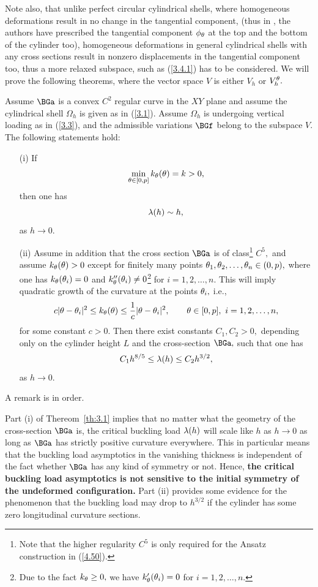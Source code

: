 Note also, that unlike perfect circular cylindrical shells, where homogeneous deformations result in no change in the tangential component, (thus in \cite{bib:Gra.Har.2}, the authors have prescribed the tangential component $\phi_\theta$ at the top and the bottom of the cylinder too), homogeneous deformations in general cylindrical shells with any cross sections result in nonzero displacements in the tangential component too, thus a more relaxed subspace, such as (\ref{3.4.1}) has to be considered. We will prove the following theorems, where the vector space $V$ is either $V_h$ or $V_h^\theta.$



\begin{theorem}
\label{th:3.1}
Assume $\BGa$ is a convex $C^2$ regular curve in the $XY$ plane and assume the cylindrical shell $\Omega_h$ is given as in (\ref{3.1}). Assume $\Omega_h$ is undergoing vertical loading as in (\ref{3.3}), and the admissible variations $\BGf$ belong to the subspace $V.$ The following statements hold:
\begin{itemize}
\item[(i)] If 
$$\min_{\theta\in[0,p]}k_\theta(\theta)=k>0,$$
then one has 
$$\lambda(h)\sim h,$$
as $h\to 0.$
\item[(ii)]  Assume in addition that the cross section $\BGa$ is of class\footnote{Note that the higher regularity $C^5$ is only required for the Ansatz construction in (\ref{4.50}).} $C^5,$ and assume $k_\theta(\theta)>0$ except for finitely many points $\theta_1,\theta_2,\dots,\theta_n\in (0,p),$ where one has $k_\theta(\theta_i)=0$ and $k_\theta''(\theta_i)\neq 0$\footnote{Due to the fact $k_\theta\geq 0,$ we have $k_\theta'(\theta_i)=0$ for $i=1,2,\dots,n.$} for $i=1,2,\dots,n.$ This will imply quadratic growth of the curvature at the points $\theta_i,$ i.e., 
\begin{equation}
\label{3.6}
c|\theta-\theta_i|^2\leq k_\theta(\theta)\leq \frac{1}{c}|\theta-\theta_i|^2,\qquad \theta\in [0,p],\ i=1,2,\dots,n,
\end{equation}
for some constant $c>0.$ Then there exist constants $C_1,C_2>0,$ depending only on the cylinder height $L$ and the cross-section 
$\BGa,$ such that one has 
$$C_1h^{8/5}\leq \lambda(h)\leq C_2h^{3/2},$$
 as $h\to 0.$
\end{itemize}
\end{theorem}

A remark is in order. 

\begin{remark}
\label{rem:3.2}
Part (i) of Thereom~\ref{th:3.1} implies that no matter what the geometry of the cross-section $\BGa$ is, the critical buckling load $\lambda(h)$ will scale like $h$ as $h\to 0$
as long as $\BGa$ has strictly positive curvature everywhere. This in particular means that the buckling load asymptotics in the vanishing thickness is independent of the fact whether $\BGa$ has any kind of symmetry or not. Hence, \textbf{the critical buckling load asymptotics is not sensitive
to the initial symmetry of the undeformed configuration.} Part (ii) provides some evidence for the phenomenon that the buckling load may drop to $h^{3/2}$ if the cylinder has some zero longitudinal curvature sections. 
\end{remark}



